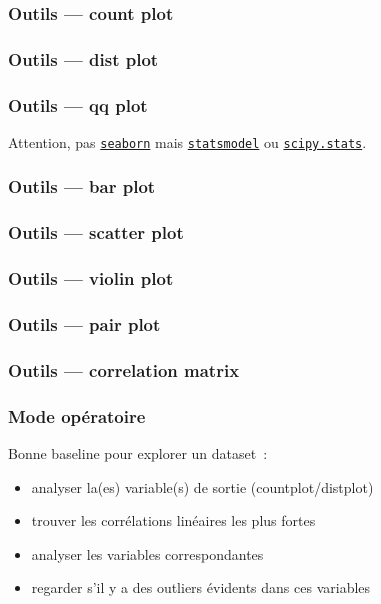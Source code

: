 \documentclass{formation}
\begin{document}
\begin{frame}
  \frametitle{Outils — count plot}

\end{frame}

\begin{frame}
  \frametitle{Outils — dist plot}

\end{frame}

\begin{frame}
  \frametitle{Outils — qq plot}


  Attention, pas \href{https://seaborn.pydata.org/}{\texttt{seaborn}}
  mais
  \href{http://www.statsmodels.org/stable/index.html}{\texttt{statsmodel}}
  ou
  \href{https://docs.scipy.org/doc/scipy/reference/stats.html}{\texttt{scipy.stats}}.
\end{frame}

\begin{frame}
  \frametitle{Outils — bar plot}

\end{frame}

\begin{frame}
  \frametitle{Outils — scatter plot}

\end{frame}

\begin{frame}
  \frametitle{Outils — violin plot}

\end{frame}

\begin{frame}
  \frametitle{Outils — pair plot}

\end{frame}

\begin{frame}
  \frametitle{Outils — correlation matrix}

\end{frame}

\begin{frame}
  \frametitle{Mode opératoire}

  Bonne baseline pour explorer un dataset :

  \begin{itemize}[<+->]
  \item analyser la(es) variable(s) de sortie (countplot/distplot)
  \item trouver les corrélations linéaires les plus fortes
  \item analyser les variables correspondantes
  \item regarder s'il y a des outliers évidents dans ces variables
  \end{itemize}
\end{frame}
\end{document}
